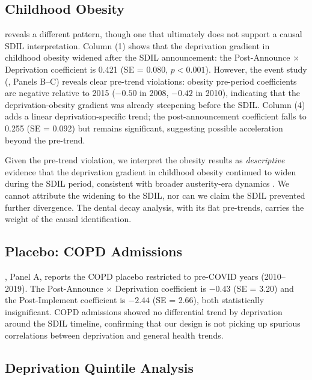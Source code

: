 \documentclass[12pt]{article}
\begin{document}


\subsection{Childhood Obesity}

 reveals a different pattern, though one that ultimately does not support a causal SDIL interpretation. Column (1) shows that the deprivation gradient in childhood obesity widened after the SDIL announcement: the Post-Announce $\times$ Deprivation coefficient is 0.421 (SE = 0.080, $p < 0.001$). However, the event study (, Panels B--C) reveals clear pre-trend violations: obesity pre-period coefficients are negative relative to 2015 ($-0.50$ in 2008, $-0.42$ in 2010), indicating that the deprivation-obesity gradient was already steepening before the SDIL. Column (4) adds a linear deprivation-specific trend; the post-announcement coefficient falls to 0.255 (SE = 0.092) but remains significant, suggesting possible acceleration beyond the pre-trend.

Given the pre-trend violation, we interpret the obesity results as \textit{descriptive} evidence that the deprivation gradient in childhood obesity continued to widen during the SDIL period, consistent with broader austerity-era dynamics \citep{marmot2020, bambra2020}. We cannot attribute the widening to the SDIL, nor can we claim the SDIL prevented further divergence. The dental decay analysis, with its flat pre-trends, carries the weight of the causal identification.



\subsection{Placebo: COPD Admissions}

, Panel A, reports the COPD placebo restricted to pre-COVID years (2010--2019). The Post-Announce $\times$ Deprivation coefficient is $-0.43$ (SE = 3.20) and the Post-Implement coefficient is $-2.44$ (SE = 2.66), both statistically insignificant. COPD admissions showed no differential trend by deprivation around the SDIL timeline, confirming that our design is not picking up spurious correlations between deprivation and general health trends.



\subsection{Deprivation Quintile Analysis}
\end{document}
